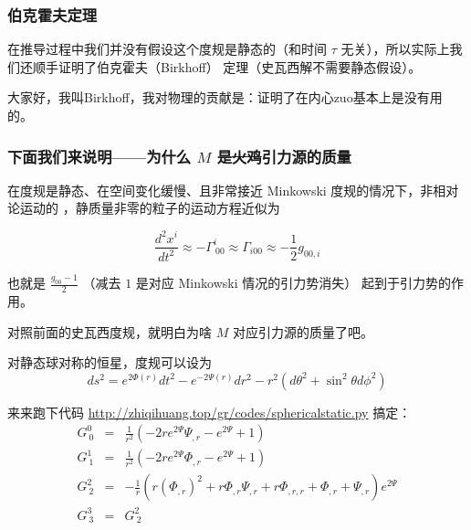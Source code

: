 \documentclass[CJK,13pt]{beamer}
\begin{document}
  \begin{frame}
    \frametitle{伯克霍夫定理}
    
    在推导过程中我们并没有假设这个度规是静态的（和时间 $\tau$ 无关），所以实际上我们还顺手证明了伯克霍夫（Birkhoff） 定理（史瓦西解不需要静态假设）。


    \emini
          大家好，我叫Birkhoff，我对物理的贡献是：证明了在内心zuo基本上是没有用的。
    \emini

  \end{frame}


  \begin{frame}
    \frametitle{下面我们来说明——为什么 $M$ 是\sout{火鸡}引力源的质量}
    在度规是静态、在空间变化缓慢、且非常接近 Minkowski 度规的情况下，非相对论运动的 ，静质量非零的粒子的运动方程近似为

    $$ \frac{d^2x^i}{dt^2}\approx -\Gamma^i_{\ 00}\approx \Gamma_{i00} \approx -\frac{1}{2}g_{00,i}$$

    也就是 $\frac{g_{00}-1}{2}$ （减去 $1$ 是对应 Minkowski 情况的引力势消失） 起到于引力势的作用。

    \skipline

    对照前面的史瓦西度规，就明白为啥 $M$ 对应引力源的质量了吧。
    
  \end{frame}

  
  \begin{frame}
    对静态球对称的恒星，度规可以设为
    $$ ds^2 = e^{2\Phi(r)}dt^2 - e^{-2\Psi(r)}dr^2 - r^2\left(d\theta^2 + \sin^2\theta d\phi^2\right)$$

    来来跑下代码 \url{http://zhiqihuang.top/gr/codes/sphericalstatic.py} 搞定：
    \begin{eqnarray}
G^0_{\ 0} &=& \frac{1}{r^{2}} \left(- 2 r e^{2 \Psi} \Psi_{, r} - e^{2 \Psi} + 1\right) \nonumber \\
G^1_{\ 1} &=& \frac{1}{r^{2}} \left(- 2 r e^{2 \Psi} \Phi_{,r} - e^{2 \Psi} + 1\right) \nonumber \\
G^2_{\ 2} &=& - \frac{1}{r} \left(r \left(\Phi_{,r}\right)^{2} + r \Phi_{,r} \Psi_{, r} + r \Phi_{,r,r} + \Phi_{,r} + \Psi_{, r}\right) e^{2 \Psi} \nonumber \\
G^3_{\ 3} &=& G^2_{\ 2} \nonumber
    \end{eqnarray}
  \end{frame}
\end{document}
